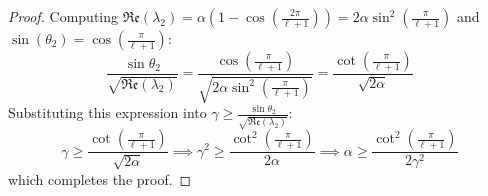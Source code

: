 \begin{proof}
Computing $\mathfrak{Re}(\lambda_2) = \alpha \left( 1 - \cos\left(\frac{2\pi}{\ell+1}\right) \right) = 2\alpha \sin^2\left(\frac{\pi}{\ell+1}\right)$ and $\sin(\theta_2) = \cos\left(\frac{\pi}{\ell+1}\right)$:
\begin{equation}
	\frac{\sin \theta_2}{\sqrt{\mathfrak{Re}(\lambda_2)}} = \frac{\cos\left(\frac{\pi}{\ell+1}\right)}{\sqrt{2\alpha \sin^2\left(\frac{\pi}{\ell+1}\right)}} = \frac{\cot\left(\frac{\pi}{\ell+1}\right)}{\sqrt{2\alpha}}
\end{equation}
Substituting this expression into $\gamma \ge \frac{\sin \theta_2}{\sqrt{\mathfrak{Re}(\lambda_2)}}$:
\begin{equation}
	\gamma \ge \frac{\cot\left(\frac{\pi}{\ell+1}\right)}{\sqrt{2\alpha}} \implies \gamma^2 \ge \frac{\cot^2\left(\frac{\pi}{\ell+1}\right)}{2\alpha} \implies \alpha \ge \frac{\cot^2\left(\frac{\pi}{\ell+1}\right)}{2\gamma^2}
\end{equation}
which completes the proof.
\end{proof}

